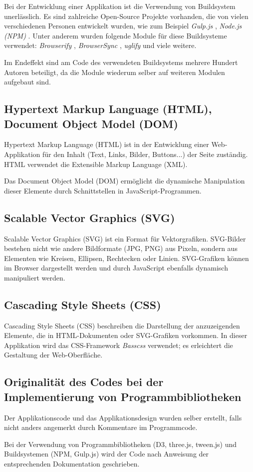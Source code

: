 Bei der Entwicklung einer Applikation ist die Verwendung von Buildsystem unerlässlich. Es sind zahlreiche Open-Source Projekte vorhanden, die von vielen verschiedenen Personen entwickelt wurden, wie zum Beispiel \textit{Gulp.js} \cite{gulp.js}, \textit{Node.js (NPM)} \cite{npm}. Unter anderem wurden folgende Module für diese Buildsysteme verwendet: \textit{Browserify} \cite{browserify},  \textit{BrowserSync} \cite{browsersync}, \textit{uglify} \cite{uglify} und viele weitere.

Im Endeffekt sind am Code des verwendeten Buildsystems mehrere Hundert Autoren beteiligt, da die Module wiederum selber auf weiteren Modulen aufgebaut sind.

\subsection{Hypertext Markup Language (HTML), Document Object Model (DOM)} \label{sec:dom}

Hypertext Markup Language (HTML) ist in der Entwicklung einer Web-Applikation für den Inhalt (Text, Links, Bilder, Buttons...) der Seite zuständig. HTML verwendet die Extensible Markup Language (XML).

Das Document Object Model (DOM) ermöglicht die dynamische Manipulation dieser Elemente durch Schnittstellen in JavaScript-Programmen.

\subsection{Scalable Vector Graphics (SVG)}

Scalable Vector Graphics (SVG) ist ein Format für Vektorgrafiken. SVG-Bilder bestehen nicht wie andere Bildformate (JPG, PNG) aus Pixeln, sondern aus Elementen wie Kreisen, Ellipsen, Rechtecken oder Linien. SVG-Grafiken können im Browser dargestellt werden und durch JavaScript ebenfalls dynamisch manipuliert werden.

\subsection{Cascading Style Sheets (CSS)}

Cascading Style Sheets (CSS) beschreiben die Darstellung der anzuzeigenden Elemente, die in HTML-Dokumenten oder SVG-Grafiken vorkommen. In dieser Applikation wird das CSS-Framework \textit{Basscss} \cite{basscss} verwendet; es erleichtert die Gestaltung der Web-Oberfläche.

\subsection{Originalität des Codes bei der Implementierung von Programmbibliotheken}

Der Applikationscode und das Applikationsdesign wurden selber erstellt, falls nicht anders angemerkt durch Kommentare im Programmcode.

Bei der Verwendung von Programmbibliotheken (D3, three.js, tween.js) und Buildsystemen (NPM, Gulp.js) wird der Code nach Anweisung der entsprechenden Dokumentation geschrieben.